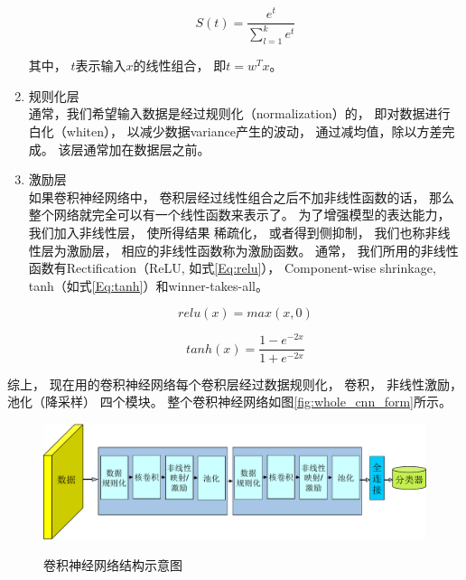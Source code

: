 \begin{enumerate}
\begin{equation}
S(t) = \frac{e^{t}}{\sum_{l=1}^k{e^t}}\label{Eq:softmax}
\end{equation}

其中， $t$表示输入$x$的线性组合， 即$t=w^Tx$。




\item 规则化层\\
通常，我们希望输入数据是经过规则化（normalization）的， 即对数据进行白化（whiten）， 以减少数据variance产生的波动， 通过减均值，除以方差完成。 该层通常加在数据层之前。

\item 激励层\\
如果卷积神经网络中， 卷积层经过线性组合之后不加非线性函数的话， 那么整个网络就完全可以有一个线性函数来表示了。 为了增强模型的表达能力， 我们加入非线性层， 使所得结果 稀疏化， 或者得到侧抑制， 我们也称非线性层为激励层， 相应的非线性函数称为激励函数。 通常， 我们所用的非线性函数有Rectification（ReLU, 如式\ref{Eq:relu}）， Component-wise shrinkage, tanh（如式\ref{Eq:tanh}）和winner-takes-all。

\begin{equation}\label{Eq:relu}
 relu(x) = max(x,0)
\end{equation}

\begin{equation}\label{Eq:tanh}
 tanh(x) = \frac{1-e^{-2x}}{1+e^{-2x}}
\end{equation}

\end{enumerate}

综上， 现在用的卷积神经网络每个卷积层经过数据规则化， 卷积， 非线性激励， 池化（降采样） 四个模块。 整个卷积神经网络如图\ref{fig:whole_cnn_form}所示。

\begin{figure}[htb]
  \centering
  \includegraphics[scale=0.7]{Pictures/CNN/cnn_net_diag-crop.pdf}\\
  \caption{卷积神经网络结构示意图}\label{fig:lenet}
\end{figure}







